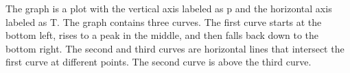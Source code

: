 The graph is a plot with the vertical axis labeled as p and the horizontal axis labeled as T. The graph contains three curves. The first curve starts at the bottom left, rises to a peak in the middle, and then falls back down to the bottom right. The second and third curves are horizontal lines that intersect the first curve at different points. The second curve is above the third curve.